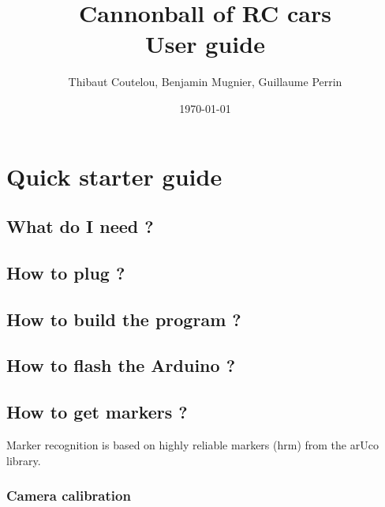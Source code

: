 \documentclass[a4paper,11pt]{report}
\title{Cannonball of RC cars\\User guide}
\author{Thibaut Coutelou, Benjamin Mugnier, Guillaume Perrin}
\date{\today}
\begin{document}
 \maketitle \tableofcontents

\setlength{\parskip}{3mm}










\chapter{Quick starter guide}

\section{What do I need ?}

\section{How to plug ?}

\section{How to build the program ?}

\section{How to flash the Arduino ?}

\section{How to get markers ?}

Marker recognition is based on highly reliable markers (hrm) from the arUco
library.

\subsection{Camera calibration}
\end{document}
